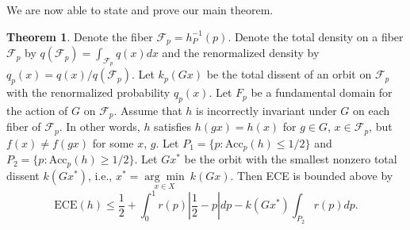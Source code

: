 \documentclass[10pt]{article} %
\theoremstyle{definition}
\newtheorem{thm}{Theorem}
\newcommand{\ECE}{\mathrm{ECE}(h)}
\newcommand{\Acc}{\mathrm{Acc}_p(h)}
\begin{document}
We are now able to state and prove our main theorem.


\begin{thm} \label{thm:inc_bound}  Denote the fiber $\mathcal{F}_p = h_P^{-1}(p)$. Denote the total density on a fiber $\mathcal{F}_p$ by $q(\mathcal{F}_p) = \int_{\mathcal{F}_p}q(x)dx$ and the renormalized density by $q_p(x) = q(x)/q(\mathcal{F}_p)$. Let $k_p(Gx)$ be the total dissent of an orbit on $\mathcal{F}_p$ with the renormalized probability $q_p(x)$. Let $F_p$ be a fundamental domain for the action of $G$ on $\mathcal{F}_p$. Assume that $h$ is incorrectly invariant under $G$ on each fiber of $\mathcal{F}_p$. In other words, $h$ satisfies $h(gx) = h(x)$ for $g \in G$, $x \in \mathcal{F}_p$, but $f(x) \neq f(gx)$ for some $x$, $g$. Let  $P_1 = \{ p \colon \Acc \leq 1/2\}$ and $P_2 = \{ p \colon \Acc \geq 1/2\}$. Let $Gx^*$ be the orbit with the smallest nonzero total dissent $k(Gx^*)$, i.e., $x^* = \underset{x \in X}{\arg \min} ~k(Gx) $.  Then ECE is bounded above by 
\[
\ECE  \leq \frac{1}{2} + \int_0^{1}r(p)\left|\frac{1}{2} - p\right|dp -  k(Gx^*)\int_{P_2}r(p) dp. 
\] 
\end{thm}
\end{document}
